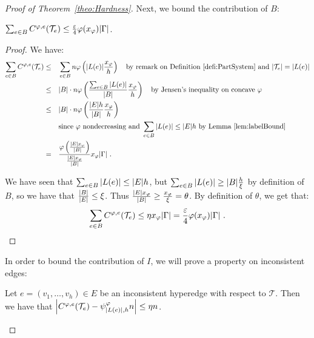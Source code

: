 \begin{proof}[Proof of Theorem~\ref{theo:Hardness}]
Next, we bound the contribution of $B$:
\begin{lemma}
  $\sum_{e \in B} C^{\varphi,e}(\mathcal{T}_e) \leq \frac{\varepsilon}{4}\varphi(x_{\varphi})\abs{\Gamma}$.
  \label{lem:contribB}
\end{lemma}
\begin{proof}
  We have:
  \begin{equation}
    \begin{aligned}
      \sum_{e \in B} C^{\varphi,e}(\mathcal{T}_e) &\leq&& \sum_{e \in B} n\varphi\left(\abs{L(e)}\frac{x_{\varphi}}{h}\right) \quad \text{by remark on Definition~\ref{defi:PartSystem} and } \abs{\mathcal{T}_e} = \abs{L(e)}\\
      &\leq&& \abs{B} \cdot n\varphi\left(\frac{\sum_{e \in B} \abs{L(e)}}{\abs{B}}\frac{x_{\varphi}}{h}\right) \quad \text{by Jensen's inequality on concave } \varphi\\
      &\leq&&  \abs{B} \cdot n\varphi\left(\frac{\abs{E}h}{\abs{B}}\frac{x_{\varphi}}{h}\right)\\
      &\quad&& \text{since } \varphi \text{ nondecreasing and } \sum_{e \in B} \abs{L(e)} \leq \abs{E}h \text{ by Lemma~\ref{lem:labelBound}}\\
      &=&& \frac{\varphi\left(\frac{\abs{E}x_{\varphi}}{\abs{B}}\right)}{\frac{\abs{E}x_{\varphi}}{\abs{B}}} x_{\varphi} \abs{\Gamma} \ .
    \end{aligned}
  \end{equation}

  We have seen that $\sum_{e \in B} \abs{L(e)} \leq \abs{E} h$, but $\sum_{e \in B} \abs{L(e)} \geq \abs{B} \frac{h}{\xi}$ by definition of $B$, so we have that $\frac{\abs{B}}{\abs{E}} \leq \xi$. Thus $\frac{\abs{E}x_{\varphi}}{\abs{B}} \geq \frac{x_{\varphi}}{\xi} = \theta$. By definition of $\theta$, we get that:
  \[ \sum_{e \in B} C^{\varphi,e}(\mathcal{T}_e) \leq \eta x_{\varphi} \abs{\Gamma} = \frac{\varepsilon}{4} \varphi(x_{\varphi})\abs{\Gamma} \ . \]
\end{proof}

In order to bound the contribution of $I$, we will prove a property on inconsistent edges:

\begin{proposition}
 Let $e = (v_1,\ldots,v_h) \in E$ be an inconsistent hyperedge with respect to $\mathcal{T}$. Then we have that $\abs{C^{\varphi,e}(\mathcal{T}_e) - \psi^{\varphi}_{\abs{L(e)},h}n } \leq \eta n$.
  \label{prop:inconsistent}
\end{proposition}


\end{proof}
